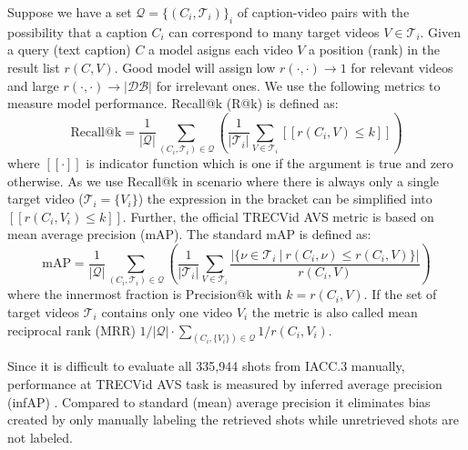 Suppose we have a set $\mathcal{Q}=\{\left(C_i,\mathcal{T}_i\right)\}_i$ of caption-video pairs with the possibility that a caption $C_i$ can correspond to many target videos $V\in\mathcal{T}_i$. Given a query (text caption) $C$ a model asigns each video $V$ a position (rank) in the result list $r(C, V)$. Good model will assign low $r(\cdot, \cdot)\to 1$ for relevant videos and large $r(\cdot, \cdot)\to |\mathcal{DB}|$ for irrelevant ones. We use the following metrics to measure model performance. Recall@k (R@k) is defined as:
\begin{equation}
    \mathrm{Recall@k}=\frac{1}{|\mathcal{Q}|}\sum_{\left(C_i,\mathcal{T}_i\right)\in \mathcal{Q}}\left(\frac{1}{|\mathcal{T}_i|}\sum_{V\in \mathcal{T}_i} [\![r(C_i,V)\leq k]\!]\right)
\end{equation}
where $[\![\cdot]\!]$ is indicator function which is one if the argument is true and zero otherwise. As we use Recall@k in scenario where there is always only a single target video ($\mathcal{T}_i=\{V_i\}$) the expression in the bracket can be simplified into $[\![r(C_i,V_i)\leq k]\!]$.
Further, the official TRECVid AVS metric is based on mean average precision (mAP). The standard mAP is defined as:
\begin{equation}
    \mathrm{mAP}=\frac{1}{|\mathcal{Q}|}\sum_{\left(C_i,\mathcal{T}_i\right)\in \mathcal{Q}}\left(\frac{1}{|\mathcal{T}_i|}\sum_{V\in \mathcal{T}_i}
    \frac{\left|\{\nu\in\mathcal{T}_i\ |\ r(C_i,\nu)\leq r(C_i,V)\}\right|}{r(C_i,V)}\right)
\end{equation}
where the innermost fraction is Precision@k with $k=r(C_i,V)$. If the set of target videos $\mathcal{T}_i$ contains only one video $V_i$ the metric is also called mean reciprocal rank (MRR) $1/|\mathcal{Q}|\cdot\sum_{\left(C_i,\{V_i\}\right)\in \mathcal{Q}}1/r(C_i,V_i)$.


Since it is difficult to evaluate all 335,944 shots from IACC.3 manually, performance at TRECVid AVS task is measured by inferred average precision (infAP) \cite{infAP}. Compared to standard (mean) average precision it eliminates bias created by only manually labeling the retrieved shots while unretrieved shots are not labeled.

